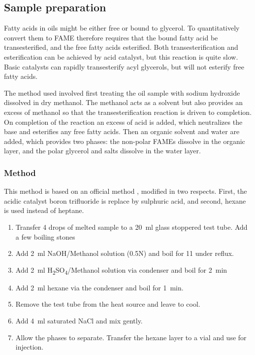 \subsection{Sample preparation}

Fatty acids in oils might be either free or bound to glycerol. To quantitatively
convert them to FAME therefore requires that the bound fatty acid be transesterified,
and the free fatty acids esterified. Both transesterification and esterification
can be achieved by acid catalyst, but this reaction is quite slow. Basic
catalysts can rapidly transesterify acyl glycerols, but will not esterify free
fatty acids.

The method used involved first treating the oil sample with sodium hydroxide
dissolved in dry methanol. The methanol acts as a solvent but also provides an
excess of methanol so that the transesterification reaction is driven to
completion. On completion of the reaction an excess of acid is added, which
neutralizes the base and esterifies any free fatty acids. Then an organic
solvent and water are added, which provides two phases: the non-polar FAMEs
dissolve in the organic layer, and the polar glycerol and salts dissolve in the
water layer.

\subsubsection{Method}

This method is based on an official method \autocite{AOCS2017}, modified in two
respects. First, the acidic catalyst boron trifluoride is replace by sulphuric
acid, and second, hexane is used instead of heptane.

\begin{enumerate}
  
\item Transfer \num{4} drops of melted sample to a \SI{20}{\milli\litre} glass
stoppered test tube. Add a few boiling stones

\item Add \SI{2}{\milli\litre} NaOH/Methanol solution (0.5N) and boil for
\SI{11}{\min} under reflux.

\item Add \SI{2}{\milli\litre} H\textsubscript{2}SO\textsubscript{4}/Methanol
solution via condenser and boil for \SI{2}{\minute}

\item  Add \SI{2}{\milli\litre} hexane via the condenser and boil for
\SI{1}{\minute}.

\item Remove the test tube from the heat source and leave to cool.

\item Add \SI{4}{\milli\litre} saturated NaCl and mix gently.

\item Allow the phases to separate. Transfer the hexane layer to a vial and use for injection.

\end{enumerate}

